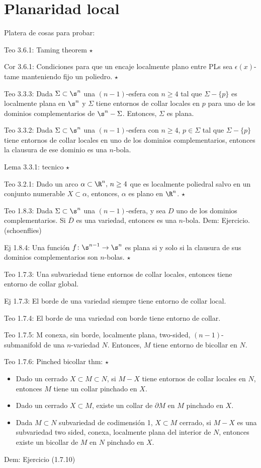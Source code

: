 \chapter{Planaridad local}

Platera de cosas para probar:

Teo 3.6.1: Taming theorem $\star$ 

Cor 3.6.1: Condiciones para que un encaje localmente plano entre PLs sea $\epsilon (x)$-tame manteniendo fijo un poliedro. $\star$

Teo 3.3.3: Dada $\Sigma\subset\s^n$ una $(n-1)$-esfera con $n\geq 4$ tal que $\Sigma -\{p\}$ es localmente plana en $\s^n$ y $\Sigma$ tiene entornos de collar locales en $p$ para uno de los dominios complementarios de $\s^n-\Sigma$. Entonces, $\Sigma$ es plana. 

Teo 3.3.2: Dada $\Sigma\subset\s^n$ una $(n-1)$-esfera con $n\geq 4$, $p\in\Sigma$ tal que $\Sigma - \{p\}$ tiene entornos de collar locales en uno de los dominios complementarios, entonces la clausura de ese dominio es una $n$-bola.

Lema 3.3.1: tecnico $\star$

Teo 3.2.1: Dado un arco $\alpha\subset\R^n,\, n\geq 4$ que es localmente poliedral salvo en un conjunto numerable $X\subset\alpha$, entonces, $\alpha$ es plano en $\R^n$. $\star$

Teo 1.8.3: Dada $\Sigma\subset\s^n$ una $(n-1)$-esfera, y sea $D$ uno de los dominios complementarios. Si $\overline{D}$ es una variedad, entonces es una $n$-bola.
Dem: Ejercicio.(schoenflies)

Ej 1.8.4: Una función $f\colon\s^{n-1}\to\s^n$ es plana si y solo si la clausura de sus dominios complementarios son $n$-bolas. $\star$

Teo 1.7.3: Una subvariedad tiene entornos de collar locales, entonces tiene entorno de collar global.

Ej 1.7.3: El borde de una variedad siempre tiene entorno de collar local.

Teo 1.7.4: El borde de una variedad con borde tiene entorno de collar.

Teo 1.7.5: M conexa, sin borde, localmente plana, two-sided, $(n-1)$-submanifold de una $n$-variedad $N$. Entonces, $M$ tiene entorno de bicollar en $N$.

Teo 1.7.6: Pinched bicollar thm: $\star$\begin{itemize}
	\item Dado un cerrado $X\subset M\subset N$, si $M-X$ tiene entornos de collar locales en $N$, entonces $M$ tiene un collar pinchado en $X$.
	\item Dado un cerrado $X\subset M$, existe un collar de $\partial M$ en $M$ pinchado en $X$.
	\item Dada $M\subset N$ subvariedad de codimensión 1, $X\subset M$ cerrado, si $M-X$ es una subvariedad two sided, conexa, localmente plana del interior de $N$, entonces existe un bicollar de $M$ en $N$ pinchado en $X$.
\end{itemize}
Dem: Ejercicio (1.7.10)

